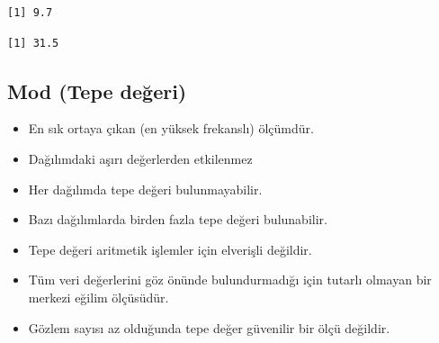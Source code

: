 \documentclass[
  letterpaper,
  DIV=11,
  numbers=noendperiod]{scrreprt}
\newenvironment{Shaded}{\begin{snugshade}}{\end{snugshade}}
\newcommand{\AttributeTok}[1]{\textcolor[rgb]{0.40,0.45,0.13}{#1}}
\newcommand{\ConstantTok}[1]{\textcolor[rgb]{0.56,0.35,0.01}{#1}}
\newcommand{\FunctionTok}[1]{\textcolor[rgb]{0.28,0.35,0.67}{#1}}
\newcommand{\NormalTok}[1]{\textcolor[rgb]{0.00,0.23,0.31}{#1}}
\newcommand{\SpecialCharTok}[1]{\textcolor[rgb]{0.37,0.37,0.37}{#1}}
\begin{document}
\begin{Shaded}
\end{Shaded}

\begin{verbatim}
[1] 9.7
\end{verbatim}

\begin{Shaded}
\end{Shaded}

\begin{verbatim}
[1] 31.5
\end{verbatim}

\subsection*{Mod (Tepe değeri)}\label{mod-tepe-deux11feri}

\begin{itemize}
\item
  En sık ortaya çıkan (en yüksek frekanslı) ölçümdür.
\item
  Dağılımdaki aşırı değerlerden etkilenmez
\item
  Her dağılımda tepe değeri bulunmayabilir.
\item
  Bazı dağılımlarda birden fazla tepe değeri bulunabilir.
\item
  Tepe değeri aritmetik işlemler için elverişli değildir.
\item
  Tüm veri değerlerini göz önünde bulundurmadığı için tutarlı olmayan
  bir merkezi eğilim ölçüsüdür.
\item
  Gözlem sayısı az olduğunda tepe değer güvenilir bir ölçü değildir.
\end{itemize}
\end{document}
